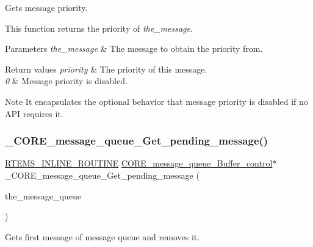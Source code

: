 Gets message priority. 

This function returns the priority of {\itshape the\+\_\+message}.


\begin{DoxyParams}{Parameters}
{\em the\+\_\+message} & The message to obtain the priority from.\\
\hline
\end{DoxyParams}

\begin{DoxyRetVals}{Return values}
{\em priority} & The priority of this message. \\
\hline
{\em 0} & Message priority is disabled.\\
\hline
\end{DoxyRetVals}
\begin{DoxyNote}{Note}
It encapsulates the optional behavior that message priority is disabled if no A\+PI requires it. 
\end{DoxyNote}
\mbox{\label{group__RTEMSScoreMessageQueue_gaae44a17e0ce00b0cff6f9894f4fe9845}} 
\subsubsection{\texorpdfstring{\_CORE\_message\_queue\_Get\_pending\_message()}{\_CORE\_message\_queue\_Get\_pending\_message()}}
{\footnotesize\ttfamily \mbox{\hyperlink{group__RTEMSScoreBaseDefs_gac216239df231d5dbd15e3520b0b9313f}{R\+T\+E\+M\+S\+\_\+\+I\+N\+L\+I\+N\+E\+\_\+\+R\+O\+U\+T\+I\+NE}} \mbox{\hyperlink{structCORE__message__queue__Buffer__control}{C\+O\+R\+E\+\_\+message\+\_\+queue\+\_\+\+Buffer\+\_\+control}}$\ast$ \+\_\+\+C\+O\+R\+E\+\_\+message\+\_\+queue\+\_\+\+Get\+\_\+pending\+\_\+message (\begin{DoxyParamCaption}\item[{\mbox{\hyperlink{structCORE__message__queue__Control}{C\+O\+R\+E\+\_\+message\+\_\+queue\+\_\+\+Control}} $\ast$}]{the\+\_\+message\+\_\+queue }\end{DoxyParamCaption})}



Gets first message of message queue and removes it. 


